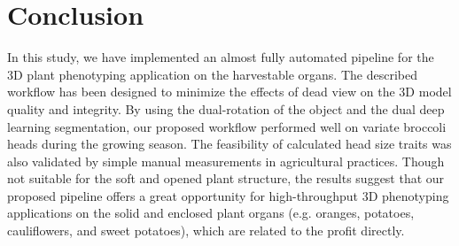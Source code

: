 


\section{Conclusion}

In this study, we have implemented an almost fully automated pipeline for the 3D plant phenotyping application on the harvestable organs. The described workflow has been designed to minimize the effects of dead view on the 3D model quality and integrity. By using the dual-rotation of the object and the dual deep learning segmentation, our proposed workflow performed well on variate broccoli heads during the growing season. The feasibility of calculated head size traits was also validated by simple manual measurements in agricultural practices. Though not suitable for the soft and opened plant structure, the results suggest that our proposed pipeline offers a great opportunity for high-throughput 3D phenotyping applications on the solid and enclosed plant organs (e.g. oranges, potatoes, cauliflowers, and sweet potatoes), which are related to the profit directly.
